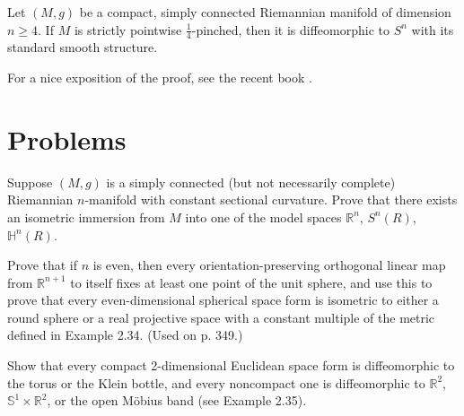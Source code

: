 \begin{theorem}
\label{thm:differentiable-sphere-theorem}
Let $(M, g)$ be a compact, simply connected Riemannian manifold of dimension $n \geq 4$. If $M$ is strictly pointwise $\frac{1}{4}$-pinched, then it is diffeomorphic to $S^n$ with its standard smooth structure.
\end{theorem}

For a nice exposition of the proof, see the recent book \cite{Bre10}.

\section{Problems}

\begin{exercise}
\label{prob:constant-sectional-curvature-immersion}
Suppose $(M, g)$ is a simply connected (but not necessarily complete) Riemannian $n$-manifold with constant sectional curvature. Prove that there exists an isometric immersion from $M$ into one of the model spaces $\mathbb{R}^n$, $S^n(R)$, $\mathbb{H}^n(R)$.
\end{exercise}

\begin{exercise}
\label{prob:fixed-points-orthogonal-map}
Prove that if $n$ is even, then every orientation-preserving orthogonal linear map from $\mathbb{R}^{n+1}$ to itself fixes at least one point of the unit sphere, and use this to prove that every even-dimensional spherical space form is isometric to either a round sphere or a real projective space with a constant multiple of the metric defined in Example 2.34. (Used on p. 349.)
\end{exercise}

\begin{exercise}
\label{prob:compact-euclidean-space-forms}
Show that every compact 2-dimensional Euclidean space form is diffeomorphic to the torus or the Klein bottle, and every noncompact one is diffeomorphic to $\mathbb{R}^2$, $\mathbb{S}^1 \times \mathbb{R}^2$, or the open Möbius band (see Example 2.35).
\end{exercise}

